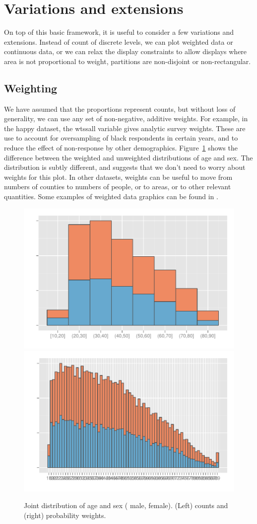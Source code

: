 \documentclass[journal]{vgtc}
\newcommand{\key}[1]
  {\protect \tikz{\fill[#1] rectangle (1ex,1ex);}}
\begin{document}
\section{Variations and extensions}
\label{sec:variations}

On top of this basic framework, it is useful to consider a few variations and extensions. Instead of count of discrete levels, we can plot weighted data or continuous data, or we can relax the display constraints to allow displays where area is not proportional to weight, partitions are non-disjoint or non-rectangular.

\subsection{Weighting}
\label{sub:weighting}

We have assumed that the proportions represent counts, but without loss of generality, we can use any set of non-negative, additive weights. For example, in the happy dataset, the {\sf wtssall} variable gives analytic survey weights. These are use to account for oversampling of black respondents in certain years, and to reduce the effect of non-response by other demographics. Figure~\ref{fig:weighting} shows the difference between the weighted and unweighted distributions of age and sex. The distribution is subtly different, and suggests that we don't need to worry about weights for this plot. In other datasets, weights can be useful to move from numbers of counties to numbers of people, or to areas, or to other relevant quantities. Some examples of weighted data graphics can be found in \citep{unwin:1998,unwin:2003aa,unwin:2006}.

\begin{figure}[htbp]
  \centering
    \includegraphics[width=0.5\linewidth]{wt-count}%
    \includegraphics[width=0.5\linewidth]{wt-wtssall}%
  \caption{Joint distribution of age and sex (\key{male} male, \key{female} female). (Left) counts and (right) probability weights.}
  \label{fig:weighting}
\end{figure}
\end{document}
